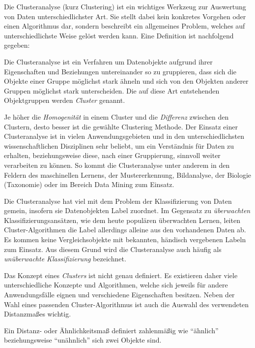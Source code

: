 Die Clusteranalyse (kurz Clustering) ist ein wichtiges Werkzeug zur Auswertung von Daten unterschiedlichster
Art. Sie stellt dabei kein konkretes Vorgehen oder einen Algorithmus dar, sondern beschreibt ein
allgemeines Problem, welches auf unterschiedlichste Weise gelöst werden kann. Eine Definition ist nachfolgend
gegeben:

\begin{theorem}[Clusteranalyse]
    Die Clusteranalyse ist ein Verfahren um Datenobjekte aufgrund ihrer Eigenschaften und Beziehungen
    untereinander so zu gruppieren, dass sich die Objekte einer Gruppe möglichst stark ähneln und sich
    von den Objekten anderer Gruppen möglichst stark unterscheiden. Die auf diese Art entstehenden
    Objektgruppen werden \textit{Cluster} genannt.
\end{theorem}

Je höher die \textit{Homogenität} in einem Cluster
und die \textit{Differenz} zwischen den Clustern, desto besser ist die gewählte Clustering Methode.
Der Einsatz einer Clusteranalyse ist in vielen Anwendungsgebieten und in den unterschiedlichsten wissenschaftlichen
Disziplinen sehr beliebt, um ein Verständnis für Daten zu erhalten, beziehungsweise diese, nach einer Gruppierung,
sinnvoll weiter verarbeiten zu können.
So kommt die Clusteranalyse unter anderem in den Feldern des maschinellen Lernens, der Mustererkennung, Bildanalyse,
der Biologie (Taxonomie) oder im Bereich Data Mining zum Einsatz. \cite[]{tan2007introduction}

Die Clusteranalyse hat viel mit dem Problem der Klassifizierung von Daten gemein, insofern sie Datenobjekten
Label zuordnet. Im Gegensatz zu \textit{überwachten} Klassifizierungsansätzen, wie dem heute populären überwachten
Lernen, leiten Cluster-Algorithmen die Label allerdings alleine aus den vorhandenen Daten ab.
Es kommen keine Vergleichsobjekte mit bekannten, händisch vergebenen Labeln zum Einsatz.
Aus diesem Grund wird die Clusteranalyse auch häufig als \textit{unüberwachte Klassifizierung} bezeichnet. \cite[]{tan2007introduction}

Das Konzept eines \textit{Clusters} ist nicht genau definiert. Es existieren daher viele unterschiedliche Konzepte
und Algorithmen, welche sich jeweils für andere Anwendungsfälle eignen und verschiedene Eigenschaften
besitzen. Neben der Wahl eines passenden Cluster-Algorithmus ist auch die Auswahl des verwendeten Distanzmaßes wichtig.

\begin{theorem}[Distanzmaß]
    Ein Distanz- oder Ähnlichkeitsmaß definiert zahlenmäßig wie ``ähnlich'' beziehungsweise ``unähnlich''
    sich zwei Objekte sind.
\end{theorem}

